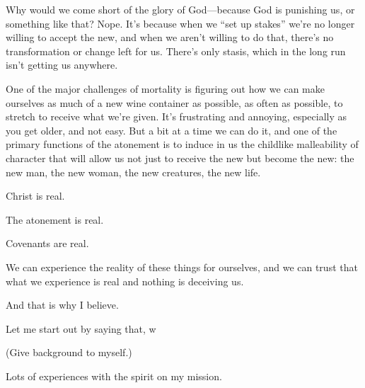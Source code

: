 \begin{compactitem}
\begin{compactitem}
					\item Why would we come short of the glory of God---because God is punishing us, or something like that? Nope. It’s because when we ``set up stakes'' we’re no longer willing to accept the new, and when we aren’t willing to do that, there’s no transformation or change left for us. There’s only stasis, which in the long run isn’t getting us anywhere.
					\item One of the major challenges of mortality is figuring out how we can make ourselves as much of a new wine container as possible, as often as possible, to stretch to receive what we’re given. It’s frustrating and annoying, especially as you get older, and not easy. But a bit at a time we can do it, and one of the primary functions of the atonement is to induce in us the childlike malleability of character that will allow us not just to receive the new but become the new: the new man, the new woman, the new creatures, the new life.
				\end{compactitem}
				
			\item Christ is real.
				\begin{compactitem}
					\item The atonement is real.
					\item Covenants are real.
					\item We can experience the reality of these things for ourselves, and we can trust that what we experience is real and nothing is deceiving us.
					\item And that is why I believe.
				\end{compactitem}
				
			\item Let me start out by saying that, w
				\begin{compactitem}
					\item (Give background to myself.)
					\item Lots of experiences with the spirit on my mission.
				\end{compactitem}
			

\end{compactitem}
